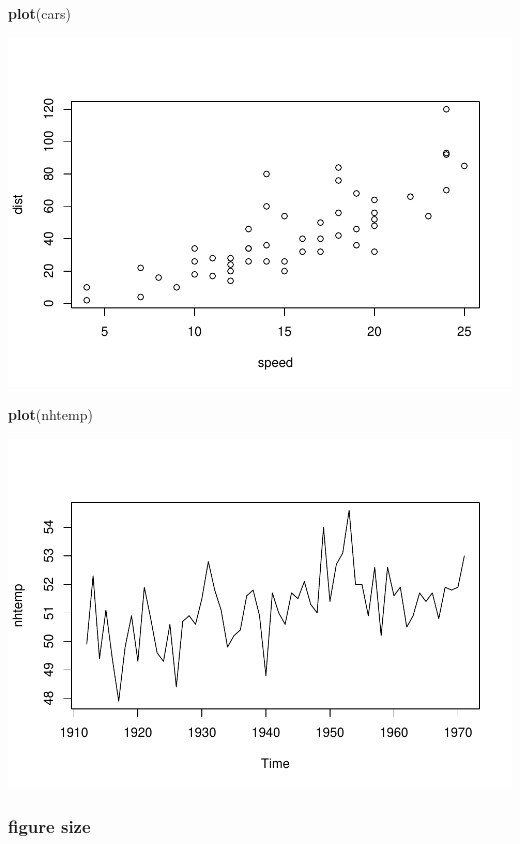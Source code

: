 \documentclass[
]{book}
\newenvironment{Shaded}{\begin{snugshade}}{\end{snugshade}}
\newcommand{\FunctionTok}[1]{\textcolor[rgb]{0.13,0.29,0.53}{\textbf{#1}}}
\newcommand{\NormalTok}[1]{#1}
\theoremstyle{definition}
\theoremstyle{definition}
\theoremstyle{definition}
\theoremstyle{definition}
\theoremstyle{remark}
\begin{document}
\begin{Shaded}
\begin{Highlighting}[]
\FunctionTok{plot}\NormalTok{(cars)}
\end{Highlighting}
\end{Shaded}

\includegraphics{202401280001-test_files/figure-latex/unnamed-chunk-5-1.pdf}

\begin{Shaded}
\begin{Highlighting}[]
\FunctionTok{plot}\NormalTok{(nhtemp)}
\end{Highlighting}
\end{Shaded}

\includegraphics{202401280001-test_files/figure-latex/unnamed-chunk-5-2.pdf}

\subsubsection{figure size}\label{figure-size}
\end{document}
